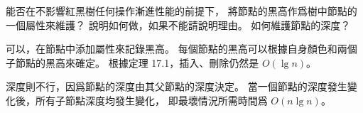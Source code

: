 \startEXERCISE
能否在不影響紅黑樹任何操作漸進性能的前提下，
將節點的黑高作爲樹中節點的一個屬性來維護？
說明如何做，如果不能請說明理由。
如何維護節點的深度？
\stopEXERCISE

\startANSWER
可以，在節點中添加屬性來記錄黑高。
每個節點的黑高可以根據自身顏色和兩個子節點的黑高來確定。
根據定理 17.1，插入、刪除仍然是 $O(\lg n)$。

深度則不行，因爲節點的深度由其父節點的深度決定。
當一個節點的深度發生變化後，所有子節點深度均發生變化，
即最壞情況所需時間爲 $O(n\lg n)$。
\stopANSWER
